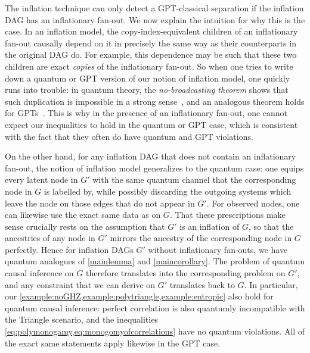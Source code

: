 \documentclass[aps,english,superscriptaddress,onecolumn,twoside,longbibliography,pra,floatfix,fleqn,nofootinbib]{revtex4-1}%
\theoremstyle{definition}
\begin{document}
  The inflation technique can only detect a GPT-classical separation if the inflation DAG has an inflationary fan-out. 
We now explain the intuition for why this is the case. 
In an inflation model, the copy-index-equivalent children of an inflationary fan-out causally depend on it in precisely the same way as their counterparts in the original DAG do. For example, this dependence may be such that these two children are exact \emph{copies} of the inflationary fan-out. So when one tries to write down a quantum or GPT version of our notion of inflation model, one quickly runs into trouble: in quantum theory, the {\em no-broadcasting theorem} shows that such duplication is impossible in a strong sense~\cite{NoCloningQuantum1996}, and an analogous theorem holds for GPTs~\cite{NoCloningGeneral2006}. This is why in the presence of an inflationary fan-out, one cannot expect our inequalities to hold in the quantum or GPT case, which is consistent with the fact that they often do have quantum and GPT violations.

On the other hand, for any inflation DAG that does not contain an inflationary fan-out, the notion of inflation model generalizes to the quantum case: one equips every latent node in $G'$ with the same quantum channel that the corresponding node in $G$ is labelled by, while possibly discarding the outgoing systems which leave the node on those edges that do not appear in $G'$. For observed nodes, one can likewise use the exact same data as on $G$. That these prescriptions make sense crucially rests on the assumption that $G'$ is an inflation of $G$, so that the ancestries of any node in $G'$ mirrors the ancestry of the corresponding node in $G$ perfectly. Hence for inflation DAGs $G'$ without inflationary fan-outs, we have quantum analogues of \cref{mainlemma} and \cref{maincorollary}. The problem of quantum causal inference on $G$ therefore translates into the corresponding problem on $G'$, and any constraint that we can derive on $G'$ translates back to $G$. In particular, our \cref{example:noGHZ,example:polytriangle,example:entropic} also hold for quantum causal inference: perfect correlation is also quantumly incompatible with the Triangle scenario, and the inequalities \cref{eq:polymonogamy,eq:monogomyofcorrelations} have no quantum violations. All of the exact same statements apply likewise in the GPT case.
\end{document}
